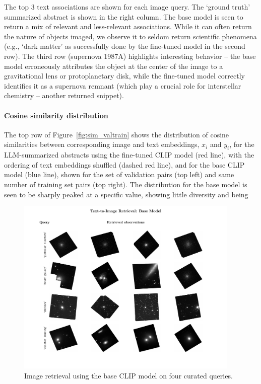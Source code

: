 \documentclass[10pt]{article} %
\begin{document}
The top 3 text associations are shown for each image query. The `ground truth' summarized abstract is shown in the right column. The base model is seen to return a mix of relevant and less-relevant associations. While it can often return the nature of objects imaged, we observe it to seldom return scientific phenomena (e.g., `dark matter' as successfully done by the fine-tuned model in the second row). The third row (supernova 1987A) highlights interesting behavior -- the base model erroneously attributes the object at the center of the image to a gravitational lens or protoplanetary disk, while the fine-tuned model correctly identifies it as a supernova remnant (which play a crucial role for interstellar chemistry -- another returned snippet).

\paragraph*{Cosine similarity distribution}

The top row of Figure~\ref{fig:sim_valtrain} shows the distribution of cosine similarities between corresponding image and text embeddings, $x_i$ and $y_i$, for the LLM-summarized abstracts using the fine-tuned CLIP model (red line), with the ordering of text embeddings shuffled (dashed red line), and for the base CLIP model (blue line), shown for the set of validation pairs (top left) and same number of training set pairs (top right). The distribution for the base model is seen to be sharply peaked at a specific value, showing little diversity and being



\begin{figure}[!h]
\includegraphics[width=0.95\textwidth]{plots/tti_base.pdf}
\caption{Image retrieval using the base CLIP model on four curated queries.}
\label{fig:tti_base}
\end{figure}
\end{document}
